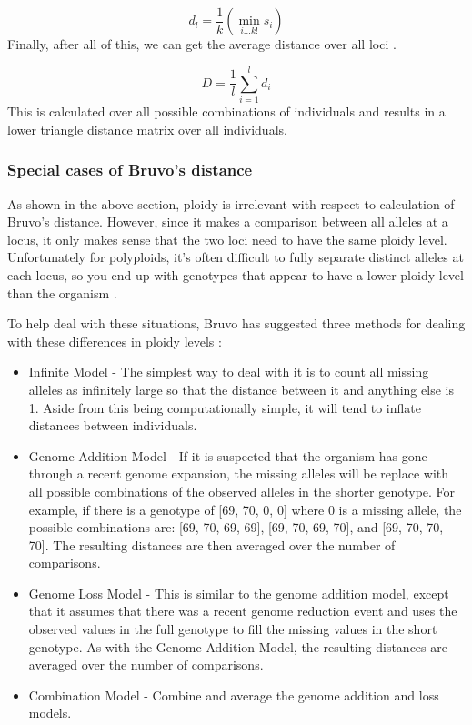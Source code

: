 \documentclass[letterpaper]{article}\usepackage[]{graphicx}\usepackage[]{color}
\begin{document}
\begin{equation}
\label{eq:d_l}
d_l = \frac{1}{k}\left(\min_{i \dotsc k!} s_i\right)
\end{equation}
\noindent
Finally, after all of this, we can get the average distance over all loci
\cite{Bruvo:2004}.

\begin{equation}
\label{eq:D}
D = \frac{1}{l}\sum_{i=1}^l d_i
\end{equation}
\noindent
This is calculated over all possible combinations of individuals and results in
a lower triangle distance matrix over all individuals.

\subsubsection{Special cases of Bruvo's distance}
\label{appendix:algorithm:bruvospecial}
As shown in the above section, ploidy is irrelevant with respect to
calculation of Bruvo's distance. However, since it makes a comparison between
all alleles at a locus, it only makes sense that the two loci need to have the
same ploidy level. Unfortunately for polyploids, it's often difficult to fully
separate distinct alleles at each locus, so you end up with genotypes that
appear to have a lower ploidy level than the organism \cite{Bruvo:2004}.

To help deal with these situations, Bruvo has suggested three methods for dealing
with these differences in ploidy levels \cite{Bruvo:2004}:
\begin{itemize}
  \item{Infinite Model -} The simplest way to deal with it is to count all
  missing alleles as infinitely large so that the distance between it and
  anything else is 1. Aside from this being computationally simple, it will tend
  to inflate distances between individuals.
  \item{Genome Addition Model -} If it is suspected that the organism has gone
  through a recent genome expansion, the missing alleles will be replace with
  all possible combinations of the observed alleles in the shorter genotype. For
  example, if there is a genotype of [69, 70, 0, 0] where 0 is a missing allele,
  the possible combinations are: [69, 70, 69, 69], [69, 70, 69, 70], and [69,
  70, 70, 70]. The resulting distances are then averaged over the number of
  comparisons.
  \item{Genome Loss Model -} This is similar to the genome addition model,
  except that it assumes that there was a recent genome reduction event and uses
  the observed values in the full genotype to fill the missing values in the
  short genotype. As with the Genome Addition Model, the resulting distances are
  averaged over the number of comparisons.
  \item{Combination Model -} Combine and average the genome addition and loss
  models.
\end{itemize}
\end{document}
